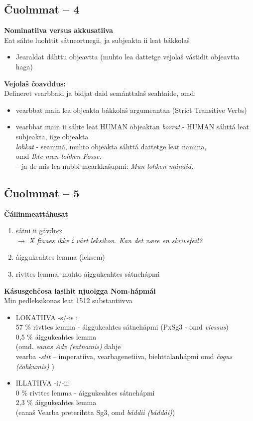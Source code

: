 \documentclass[a4paper,14pt]{article}
\begin{document}
\subsection{Čuolmmat -- 4}
\textbf{Nominatiiva versus akkusatiiva} \\
Eat sáhte luohttit sátneortnegii, ja subjeakta ii leat bákkolaš
\begin{itemize}
\item Jearaldat dáhttu objeavtta (muhto lea dattetge vejolaš vástidit objeavtta haga)
\end{itemize}

\textbf{Vejolaš čoavddus:} \\
Defineret vearbbaid ja bidjat daid semánttalaš seahtaide, omd: 
\begin{itemize}
\item vearbbat main lea objeakta bákkolaš argumeantan  (Strict Transitive Verbs)
\item vearbbat main ii sáhte leat HUMAN objeaktan 
\textit{borrat}   - HUMAN sáhttá leat subjeakta, iige objeakta \\
 
\textit{lohkat}  - seammá, muhto objeakta sáhttá dattetge leat namma, \\ omd   \textit{Ikte mun lohken Fosse.}  \\ 
-- ja de mis lea nubbi mearkkašupmi: \textit{Mun lohken mánáid.}
\end{itemize}


\subsection{Čuolmmat -- 5}
\textbf{Čállinmeattáhusat} \\
\begin{enumerate}
\item sátni ii gávdno: \\ \textit{$\rightarrow$ X finnes ikke i vårt leksikon. Kan det være en skrivefeil?}
\item áiggukeahtes lemma (leksem)
\item rivttes lemma, muhto áiggukeahtes sátnehápmi
\end{enumerate}

\textbf{Kásusgehčosa lasihit njuolgga Nom-hápmái} \\
Min pedleksikonas leat 1512 substantiivva
\begin{itemize}
\item LOKATIIVA -s/-is : \\
57 \% rivttes lemma - áiggukeahtes sátnehápmi (PxSg3 - omd \textit{viessus})  \\  0,5 \% áiggukeahtes lemma \\  (omd. \textit{eanas Adv (eatnamis)}  dahje \\ vearba \textit{-stit} -- imperatiiva, vearbagenetiiva, biehttalanhápmi omd \textit{čogus (čohkumis)} )
\item ILLATIIVA -i/-ii: \\
0 \% rivttes lemma - áiggukeahtes sátnehápmi \\  2,3 \% áiggukeahtes lemma \\ (eanaš Vearba preterihtta Sg3, omd \textit{báddii (báddái)}) 
\end{itemize}
\end{document}
